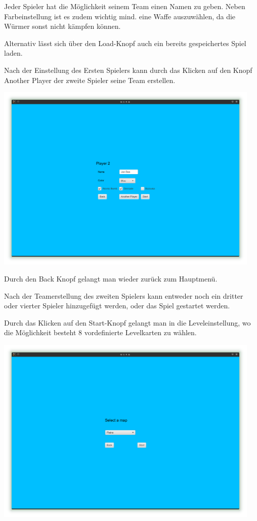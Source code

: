 \documentclass{scrreprt}
\begin{document}
Jeder Spieler hat die Möglichkeit seinem Team einen Namen zu geben.
Neben Farbeinstellung ist es zudem wichtig mind. eine Waffe auszuwählen, da die Würmer sonst
nicht kämpfen können.

Alternativ lässt sich über den Load-Knopf auch ein bereits gespeichertes Spiel laden.

Nach der Einstellung des Ersten Spielers kann durch das Klicken auf den Knopf Another Player
der zweite Spieler seine Team erstellen.

\includegraphics[height=9cm]{Screenshot6.png}

Durch den Back Knopf gelangt man wieder zurück zum Hauptmenü.

Nach der Teamerstellung des zweiten Spielers kann entweder noch ein dritter oder vierter Spieler
hinzugefügt werden, oder das Spiel gestartet werden.

Durch das Klicken auf den Start-Knopf gelangt man in die Leveleinstellung, wo die Mög\-lichkeit
besteht 8 vordefinierte Levelkarten zu wählen.

\includegraphics[height=9cm]{Screenshot7.png}
\end{document}
